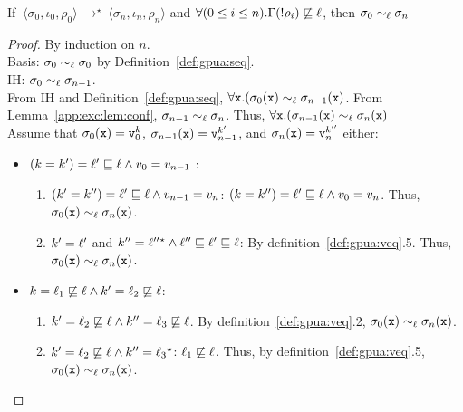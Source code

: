 \begin{myLemma}
\label{app:exc:lem:sigeq}
If $~\langle \sigma_0, \iota_0, \rho_0 \rangle~ \rightarrow^{\star}
~\langle \sigma_n, \iota_n, \rho_n \rangle$ and 
$\forall (0 \leq i \leq n).\Gamma(!\rho_i) \not\sqsubseteq \ell$, 
then $\sigma_0 \sim_\ell \sigma_n$
\end{myLemma}
\begin{proof}
By induction on $n$. \\
Basis: $\sigma_0 \sim_\ell \sigma_0$ by Definition~\ref{def:gpua:seq}.\\
IH: $\sigma_0 \sim_\ell \sigma_{n-1}$.\\
From IH and Definition~\ref{def:gpua:seq}, $\forall
\texttt{x}.(\sigma_0(\texttt{x}) \sim_\ell \sigma_{n-1}(\texttt{x})$. 
From Lemma~\ref{app:exc:lem:conf}, $\sigma_{n-1} \sim_\ell \sigma_n$. Thus,
$\forall \texttt{x}.(\sigma_{n-1}(\texttt{x}) \sim_\ell \sigma_n(\texttt{x})$\\
Assume that $\sigma_0(\texttt{x}) = \texttt{v}_0^k$, 
$\sigma_{n-1}(\texttt{x}) = \texttt{v}_{n-1}^{k'}$, and
$\sigma_n(\texttt{x}) = \texttt{v}_n^{k''}$ either:
\begin{itemize}
\item $(k = k') = \ell' \sqsubseteq \ell \wedge v_0 = v_{n-1}$ : 
  \begin{enumerate}
  \item $(k' = k'') = \ell' \sqsubseteq \ell \wedge v_{n-1} = v_n$: 
    $(k = k'') = \ell' \sqsubseteq \ell \wedge v_0 = v_n$. Thus, $\sigma_0(\texttt{x})
    \sim_\ell \sigma_n(\texttt{x})$.
  \item $k' = \ell'$ and $k''  =  \ell''{}^\star   \wedge
    \ell'' \sqsubseteq \ell' \sqsubseteq \ell$: By
    definition~\ref{def:gpua:veq}.5. Thus, $\sigma_0(\texttt{x})
    \sim_\ell \sigma_n(\texttt{x})$.
  \end{enumerate}

\item $k = \ell_1 \not\sqsubseteq \ell \wedge k' =
  \ell_2 \not\sqsubseteq \ell $: 
  \begin{enumerate}
  \item $k' = \ell_2 \not\sqsubseteq \ell \wedge k'' =
    \ell_3 \not\sqsubseteq \ell $. By
    definition~\ref{def:gpua:veq}.2, $\sigma_0(\texttt{x}) \sim_\ell \sigma_n(\texttt{x})$.
  \item $k' = \ell_2 \not\sqsubseteq \ell \wedge k'' =
    \ell_3{}^\star  $: $\ell_1 \not\sqsubseteq \ell$. Thus, by
    definition~\ref{def:gpua:veq}.5, $\sigma_0(\texttt{x}) \sim_\ell \sigma_n(\texttt{x})$. 
  \end{enumerate}


\end{itemize}
\end{proof}
